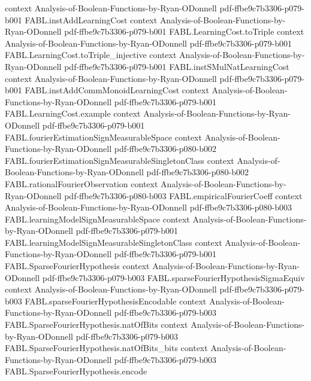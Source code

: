 \begin{theorem}
  {context}
  {Analysis-of-Boolean-Functions-by-Ryan-ODonnell}
  {pdf-ffbe9c7b3306-p079-b001}
\proofstep
  {FABL.instAddLearningCost}
  {context}
  {Analysis-of-Boolean-Functions-by-Ryan-ODonnell}
  {pdf-ffbe9c7b3306-p079-b001}
\proofstep
  {FABL.LearningCost.toTriple}
  {context}
  {Analysis-of-Boolean-Functions-by-Ryan-ODonnell}
  {pdf-ffbe9c7b3306-p079-b001}
\proofstep
  {FABL.LearningCost.toTriple_injective}
  {context}
  {Analysis-of-Boolean-Functions-by-Ryan-ODonnell}
  {pdf-ffbe9c7b3306-p079-b001}
\proofstep
  {FABL.instSMulNatLearningCost}
  {context}
  {Analysis-of-Boolean-Functions-by-Ryan-ODonnell}
  {pdf-ffbe9c7b3306-p079-b001}
\proofstep
  {FABL.instAddCommMonoidLearningCost}
  {context}
  {Analysis-of-Boolean-Functions-by-Ryan-ODonnell}
  {pdf-ffbe9c7b3306-p079-b001}
\proofstep
  {FABL.LearningCost.example}
  {context}
  {Analysis-of-Boolean-Functions-by-Ryan-ODonnell}
  {pdf-ffbe9c7b3306-p079-b001}
\proofstep
  {FABL.fourierEstimationSignMeasurableSpace}
  {context}
  {Analysis-of-Boolean-Functions-by-Ryan-ODonnell}
  {pdf-ffbe9c7b3306-p080-b002}
\proofstep
  {FABL.fourierEstimationSignMeasurableSingletonClass}
  {context}
  {Analysis-of-Boolean-Functions-by-Ryan-ODonnell}
  {pdf-ffbe9c7b3306-p080-b002}
\proofstep
  {FABL.rationalFourierObservation}
  {context}
  {Analysis-of-Boolean-Functions-by-Ryan-ODonnell}
  {pdf-ffbe9c7b3306-p080-b003}
\proofstep
  {FABL.empiricalFourierCoeff}
  {context}
  {Analysis-of-Boolean-Functions-by-Ryan-ODonnell}
  {pdf-ffbe9c7b3306-p080-b003}
\proofstep
  {FABL.learningModelSignMeasurableSpace}
  {context}
  {Analysis-of-Boolean-Functions-by-Ryan-ODonnell}
  {pdf-ffbe9c7b3306-p079-b001}
\proofstep
  {FABL.learningModelSignMeasurableSingletonClass}
  {context}
  {Analysis-of-Boolean-Functions-by-Ryan-ODonnell}
  {pdf-ffbe9c7b3306-p079-b001}
\proofstep
  {FABL.SparseFourierHypothesis}
  {context}
  {Analysis-of-Boolean-Functions-by-Ryan-ODonnell}
  {pdf-ffbe9c7b3306-p079-b003}
\proofstep
  {FABL.sparseFourierHypothesisSigmaEquiv}
  {context}
  {Analysis-of-Boolean-Functions-by-Ryan-ODonnell}
  {pdf-ffbe9c7b3306-p079-b003}
\proofstep
  {FABL.sparseFourierHypothesisEncodable}
  {context}
  {Analysis-of-Boolean-Functions-by-Ryan-ODonnell}
  {pdf-ffbe9c7b3306-p079-b003}
\proofstep
  {FABL.SparseFourierHypothesis.natOfBits}
  {context}
  {Analysis-of-Boolean-Functions-by-Ryan-ODonnell}
  {pdf-ffbe9c7b3306-p079-b003}
\proofstep
  {FABL.SparseFourierHypothesis.natOfBits_bits}
  {context}
  {Analysis-of-Boolean-Functions-by-Ryan-ODonnell}
  {pdf-ffbe9c7b3306-p079-b003}
\proofstep
  {FABL.SparseFourierHypothesis.encode}

\end{theorem}
